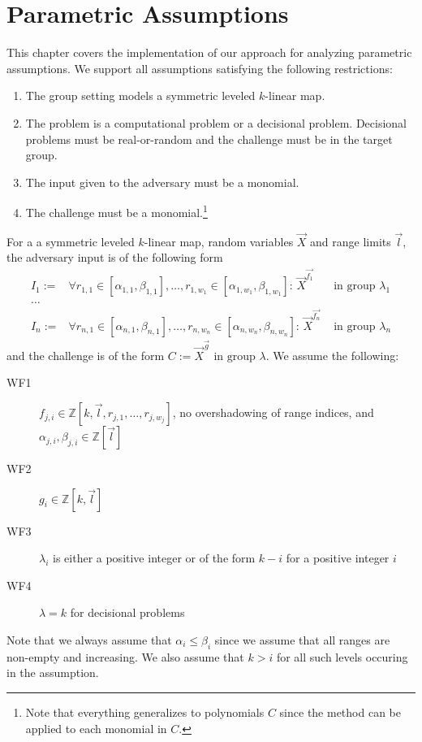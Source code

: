 \chapter{Parametric Assumptions}

This chapter covers the implementation of our approach for
analyzing parametric assumptions.
We support all assumptions satisfying the following restrictions:
\begin{enumerate}
\item The group setting models a symmetric leveled $k$-linear map.
\item The problem is a computational problem or a decisional
 problem. Decisional problems must be real-or-random and
 the challenge must be in the target group.
\item The input given to the adversary must be a monomial.
\item The challenge must be a monomial.\footnote{
    Note that everything generalizes to polynomials $C$ since
    the method can be applied to each monomial in $C$.}
\end{enumerate}%
%
\newcommand{\range}[1]{r_{#1} \in [\alpha_{#1},\beta_{#1}]}%
\renewcommand{\brack}[1]{[#1]}%
%
\label{assumption_def}%
For a a symmetric leveled $k$-linear map,
  random variables $\vec{X}$ and range limits $\vec{l}$,
  the adversary input is of the following form
\begin{align*}
  I_1 :={}& \forall \range{1,1},\ldots,\range{1,w_1}:\, \vec{X}^{\vec{f_{1}}}
    & \text{ in group }\lambda_1\\
  \ldots & \\
  I_n :={}& \forall \range{n,1},\ldots,\range{n,w_n}:\, \vec{X}^{\vec{f_{n}}}
    & \text{ in group }\lambda_n
\end{align*}
  and the challenge is of the form
  $C := \vec{X}^{\vec{g}} \text{ in group }\lambda$.
We assume the following:
\begin{description}
\item[WF1] $f_{j,i} \in \mathbb{Z}[k,\vec{l},r_{j,1},\ldots,r_{j,w_j}]$,
          no overshadowing of range indices, and
          $\alpha_{j,i},\beta_{j,i} \in \mathbb{Z}[\vec{l}]$
\item[WF2] $g_i \in \mathbb{Z}[k,\vec{l}]$
\item[WF3] $\lambda_i$ is either a positive integer or
  of the form $k - i$ for a positive integer $i$
\item[WF4] $\lambda=k$ for decisional problems
\end{description}
%
Note that we always assume that $\alpha_i \leq \beta_i$ since
  we assume that all ranges are non-empty and increasing.
We also assume that $k > i$ for all such levels occuring in the
  assumption.
